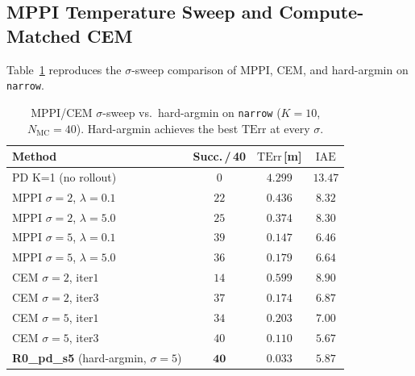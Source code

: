 \documentclass[11pt,onecolumn,a4paper]{article}
\newcommand{\Nm}{N_{\mathrm{MC}}}
\newcommand{\TErr}{\mathrm{TErr}}
\newcommand{\IAE}{\mathrm{IAE}}
\begin{document}
\begin{appendices}

\section{MPPI Temperature Sweep and Compute-Matched CEM}\label{app:mppi-details}

Table~\ref{tab:sigma-sweep-mppi} reproduces the $\sigma$-sweep comparison
of MPPI, CEM, and hard-argmin on \texttt{narrow}.

\begin{table}[t]
\centering
\caption{MPPI/CEM $\sigma$-sweep vs.\ hard-argmin on \texttt{narrow}
($K = 10$, $\Nm = 40$). Hard-argmin achieves the best $\TErr$ at every
$\sigma$.}\label{tab:sigma-sweep-mppi}
\begin{tabular}{lccc}
\toprule
Method & Succ.\,/\,40 & $\TErr$\,[m] & $\IAE$ \\
\midrule
PD K=1 (no rollout) & $0$ & $4.299$ & $13.47$ \\
\midrule
MPPI $\sigma{=}2$, $\lambda{=}0.1$ & $22$ & $0.436$ & $8.32$ \\
MPPI $\sigma{=}2$, $\lambda{=}5.0$ & $25$ & $0.374$ & $8.30$ \\
MPPI $\sigma{=}5$, $\lambda{=}0.1$ & $39$ & $0.147$ & $6.46$ \\
MPPI $\sigma{=}5$, $\lambda{=}5.0$ & $36$ & $0.179$ & $6.64$ \\
\midrule
CEM $\sigma{=}2$, iter$1$ & $14$ & $0.599$ & $8.90$ \\
CEM $\sigma{=}2$, iter$3$ & $37$ & $0.174$ & $6.87$ \\
CEM $\sigma{=}5$, iter$1$ & $34$ & $0.203$ & $7.00$ \\
CEM $\sigma{=}5$, iter$3$ & $40$ & $0.110$ & $5.67$ \\
\midrule
\textbf{R0\_pd\_s5} (hard-argmin, $\sigma{=}5$) & $\mathbf{40}$ & $\mathbf{0.033}$ & $\mathbf{5.87}$ \\
\bottomrule
\end{tabular}
\end{table}


\end{appendices}
\end{document}
